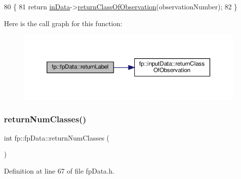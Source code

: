 \begin{DoxyCode}
80                                                          \{
81                 \textcolor{keywordflow}{return} \hyperlink{classfp_1_1fpData_a49d7c3f58bcf88843c25b1b0c9714ebe}{inData}->\hyperlink{classfp_1_1inputData_a0a767252e950159110d3f2a0c74064ec}{returnClassOfObservation}(observationNumber);
82             \}
\end{DoxyCode}
Here is the call graph for this function\+:
\nopagebreak
\begin{figure}[H]
\begin{center}
\leavevmode
\includegraphics[width=350pt]{classfp_1_1fpData_aac722f51424cb7f6ab7d89525f82cc72_cgraph}
\end{center}
\end{figure}
\mbox{\label{classfp_1_1fpData_a7abfc93af30b7262d59b6d304796a09d}} 
\subsubsection{\texorpdfstring{return\+Num\+Classes()}{returnNumClasses()}}
{\footnotesize\ttfamily int fp\+::fp\+Data\+::return\+Num\+Classes (\begin{DoxyParamCaption}{ }\end{DoxyParamCaption})\hspace{0.3cm}{\ttfamily [inline]}}



Definition at line 67 of file fp\+Data.\+h.


